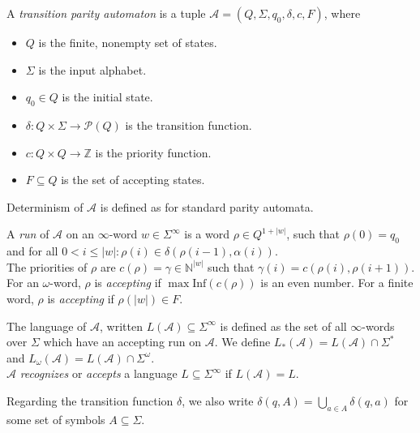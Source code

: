\begin{defn}
	A \emph{transition parity automaton} is a tuple $\mathcal{A} = (Q, \Sigma, q_0, \delta, c, F)$, where
	\begin{itemize}
		\item $Q$ is the finite, nonempty set of states.
		\item $\Sigma$ is the input alphabet.
		\item $q_0 \in Q$ is the initial state.
		\item $\delta : Q \times \Sigma \rightarrow \mathcal{P}(Q)$ is the transition function.
		\item $c : Q \times Q \rightarrow \mathbb{Z}$ is the priority function.
		\item $F \subseteq Q$ is the set of accepting states.
	\end{itemize}
	Determinism of $\mathcal{A}$ is defined as for standard parity automata.
	
	A \emph{run} of $\mathcal{A}$ on an $\infty$-word $w \in \Sigma^\infty$ is a word $\rho \in Q^{1 + |w|}$, such that $\rho(0) = q_0$ and for all $0 < i \leq |w|: \rho(i) \in \delta(\rho(i-1), \alpha(i))$. \\
	The priorities of $\rho$ are $c(\rho) = \gamma \in \mathbb{N}^{|w|}$ such that $\gamma(i) = c(\rho(i), \rho(i+1))$. For an $\omega$-word, $\rho$ is \emph{accepting} if $\max \text{Inf}(c(\rho))$ is an even number. For a finite word, $\rho$ is \emph{accepting} if $\rho(|w|) \in F$.
	
	The language of $\mathcal{A}$, written $L(\mathcal{A}) \subseteq \Sigma^\infty$ is defined as the set of all $\infty$-words over $\Sigma$ which have an accepting run on $\mathcal{A}$. We define $L_*(\mathcal{A}) = L(\mathcal{A}) \cap \Sigma^*$ and $L_\omega(\mathcal{A}) = L(\mathcal{A}) \cap \Sigma^\omega$. \\
	$\mathcal{A}$ \emph{recognizes} or \emph{accepts} a language $L \subseteq \Sigma^\infty$ if $L(\mathcal{A}) = L$.
	
	Regarding the transition function $\delta$, we also write $\delta(q, A) = \bigcup\limits_{a \in A} \delta(q, a)$ for some set of symbols $A \subseteq \Sigma$.
\end{defn}


